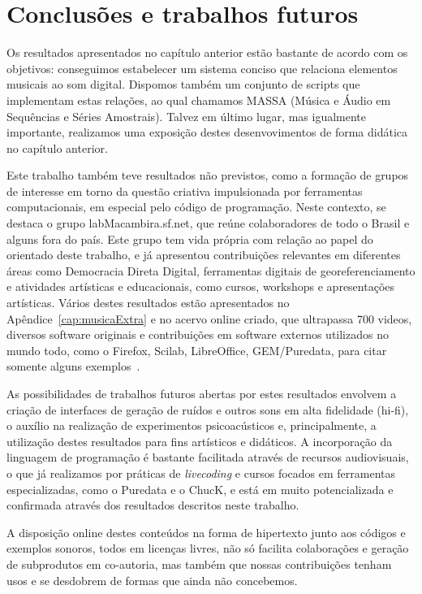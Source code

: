 \chapter{Conclusões e trabalhos futuros} %
\label{cap:conclusao}

Os resultados apresentados no capítulo anterior estão bastante de acordo
com os objetivos: conseguimos estabelecer um sistema conciso
que relaciona elementos musicais ao som digital. Dispomos também um conjunto
de scripts que implementam estas relações, ao qual chamamos MASSA (Música
e Áudio em Sequências e Séries Amostrais). Talvez em último lugar, mas igualmente
importante, realizamos uma exposição destes desenvovimentos de forma didática no
capítulo anterior.

Este trabalho também teve resultados não previstos, como a formação de grupos
de interesse em torno da questão criativa impulsionada por ferramentas computacionais,
em especial pelo código de programação. Neste contexto, se destaca o grupo
labMacambira.sf.net, que reúne colaboradores de todo o Brasil e alguns fora do país.
Este grupo tem vida própria com relação ao papel do orientado
deste trabalho, e já apresentou contribuições relevantes em diferentes áreas
como Democracia Direta Digital, ferramentas digitais de georeferenciamento e
atividades artísticas e educacionais, como cursos, workshops e apresentações artísticas. Vários destes resultados estão apresentados no Apêndice~\ref{cap:musicaExtra} e no acervo online criado, que ultrapassa 700 videos, diversos software originais e contribuições em software externos utilizados no mundo todo, como o Firefox, Scilab, LibreOffice, GEM/Puredata, para citar somente alguns exemplos~\cite{siteLM,wikiLM,vimeoLM}.

As possibilidades de trabalhos futuros abertas por estes resultados envolvem a criação de interfaces de geração de ruídos e outros sons em alta fidelidade (hi-fi), o auxílio na realização de experimentos psicoacústicos e, principalmente, a utilização destes resultados para fins artísticos e didáticos. A incorporação da linguagem de programação é bastante facilitada através de recursos audiovisuais, o que já realizamos por práticas de \emph{livecoding} e cursos focados em ferramentas especializadas, como o Puredata e o ChucK, e está em muito potencializada e confirmada através dos resultados descritos neste trabalho.

A disposição online destes conteúdos na forma de hipertexto junto aos códigos e exemplos sonoros, todos em licenças livres, não só facilita colaborações e geração de subprodutos em co-autoria, mas também que nossas contribuições tenham usos e se desdobrem de formas que ainda não concebemos.







